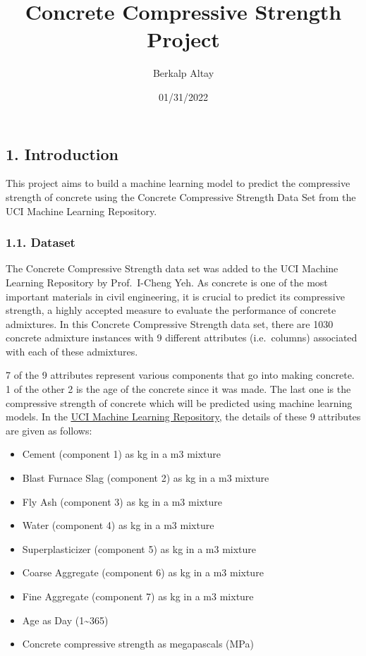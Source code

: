 \documentclass[
]{article}
\title{Concrete Compressive Strength Project}
\author{Berkalp Altay}
\date{01/31/2022}
\providecommand{\tightlist}{%
  \setlength{\itemsep}{0pt}\setlength{\parskip}{0pt}}
\begin{document}
\maketitle

{
\setcounter{tocdepth}{3}
\tableofcontents
}
\newpage

\hypertarget{introduction}{%
\subsection{1. Introduction}\label{introduction}}

This project aims to build a machine learning model to predict the
compressive strength of concrete using the Concrete Compressive Strength
Data Set from the UCI Machine Learning Repository.

\hypertarget{dataset}{%
\subsubsection{1.1. Dataset}\label{dataset}}

The Concrete Compressive Strength data set was added to the UCI Machine
Learning Repository by Prof.~I-Cheng Yeh. As concrete is one of the most
important materials in civil engineering, it is crucial to predict its
compressive strength, a highly accepted measure to evaluate the
performance of concrete admixtures. In this Concrete Compressive
Strength data set, there are 1030 concrete admixture instances with 9
different attributes (i.e.~columns) associated with each of these
admixtures.

7 of the 9 attributes represent various components that go into making
concrete. 1 of the other 2 is the age of the concrete since it was made.
The last one is the compressive strength of concrete which will be
predicted using machine learning models. In the
\underline{\href{https://archive.ics.uci.edu/ml/datasets/Concrete+Compressive+Strength}{UCI Machine Learning Repository}},
the details of these 9 attributes are given as follows:

\begin{itemize}
\tightlist
\item
  Cement (component 1) as kg in a m3 mixture
\item
  Blast Furnace Slag (component 2) as kg in a m3 mixture
\item
  Fly Ash (component 3) as kg in a m3 mixture
\item
  Water (component 4) as kg in a m3 mixture
\item
  Superplasticizer (component 5) as kg in a m3 mixture
\item
  Coarse Aggregate (component 6) as kg in a m3 mixture
\item
  Fine Aggregate (component 7) as kg in a m3 mixture
\item
  Age as Day (1\textasciitilde365)
\item
  Concrete compressive strength as megapascals (MPa)
\end{itemize}
\end{document}
